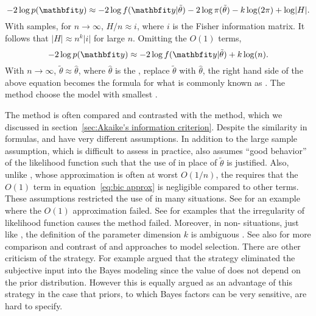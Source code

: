 \begin{equation}
  -2\log p(\data) \approx
  -2\log f(\data|\tilde\theta) - 2\log\pi(\tilde\theta) - k\log(2\pi) + \log\lvert H \rvert.
  \label{eq:bic approx}
\end{equation}
With \iid samples, for $n\to\infty$, $H/n \approx i$, where $i$ is the Fisher
information matrix. It follows that $\lvert H \rvert \approx n^k \lvert i
\rvert$ for large $n$. Omitting the $O(1)$ terms,
\begin{equation}
  -2\log p(\data) \approx -2\log f(\data|\tilde\theta) + k\log(n).
\end{equation}
With $n\to\infty$, $\tilde\theta\approx\hat{\theta}$, where $\hat{\theta}$ is
the \mle, replace $\tilde\theta$ with $\hat{\theta}$, the right hand side of the
above equation becomes the formula for what is commonly known as \bic. The
\bic method choose the model with smallest \bic.

The \bic method is often compared and contrasted with the \aic method, which
we discussed in section~\ref{sec:Akaike's information criterion}. Despite the
similarity in formulas, \aic and \bic have very different assumptions. In
addition to the large sample assumption, which is difficult to assess in
practice, \bic also assumes ``good behavior'' of the likelihood function such
that the use of \mle in place of $\tilde\theta$ is justified. Also, unlike
\aic, whose approximation is often at worst $O(1/n)$, the \bic requires that
the $O(1)$ term in equation~\eqref{eq:bic approx} is negligible compared to
other terms. These assumptions restricted the use of \bic in many situations.
See \cite{Gelfand:1994ux} for an example where the $O(1)$ approximation
failed. See \cite{Berger:2001uy} for examples that the irregularity of
likelihood function causes the \bic method failed. Moreover, in non-\iid
situations, just like \aic, the definition of the parameter dimension $k$ is
ambiguous \cite{Spiegelhalter:1998uc, Kass:1995vb}. See also
\cite[][chap.~5 and chap.~6]{Burnham:2002wc} for more comparison and
contrast of \aic and \bic approaches to model selection. There are other
criticism of the \bic strategy. For example
\cite[][chap.~7]{Robert:2007tc} argued that the \bic strategy eliminated
the subjective input into the Bayes modeling since the value of \bic does not
depend on the prior distribution. However this is equally argued as an
advantage of this strategy in the case that priors, to which Bayes factors can
be very sensitive, are hard to specify.

\ifx\inthesis\undefined
\printbibliography
\else\relax\fi
